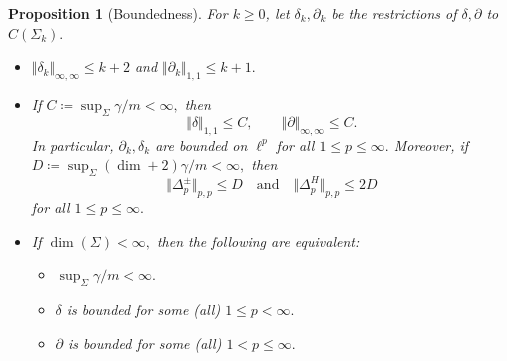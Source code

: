 \documentclass[10pt]{amsart}
\newtheorem{proposition}[theorem]{Proposition}
\theoremstyle{definition}
\begin{document}
\begin{proposition}[Boundedness]\label{boundedness} For $k\geq 0$, let $\delta_k,\partial_k$ be the restrictions of $\delta,\partial$ to $C(\Sigma_k).$
\begin{itemize}
    \item [(a)]  $\Vert\delta_k\Vert_{\infty,\infty}\leq k+2$ and   $\Vert\partial_k\Vert_{1,1}\leq k+1.$
    \item [(b)]If $C\coloneqq\sup_\Sigma\gamma\slash m<\infty,$ then \[\Vert\delta\Vert_{1,1}\leq C,\qquad\Vert\partial\Vert_{\infty,\infty}\leq C.\]
    In particular, $\partial_k,\delta_k$ are bounded on $\ell^p$ for all $1\leq p\leq\infty.$ Moreover, if $D\coloneqq\sup_{\Sigma}(\dim+2)\gamma\slash m<\infty,$ then \[\Vert \Delta^\pm_{p}\Vert_{p,p}\leq D\quad\text{and}\quad\Vert\Delta^H_{p}\Vert_{p,p}\leq 2D\] for all $1\leq p\leq \infty.$
    \item [(c)]If $\dim(\Sigma)<\infty,$ then the following are equivalent:
    \begin{itemize}
        \item [(i)]$\sup_\Sigma\gamma\slash m<\infty.$
        \item [(ii)]$\delta$ is bounded for some (all) $1\leq p<\infty.$
        \item [(iii)]$\partial$ is bounded for some (all) $1<p\leq\infty.$
    \end{itemize}
\end{itemize}
\end{proposition}
\end{document}

